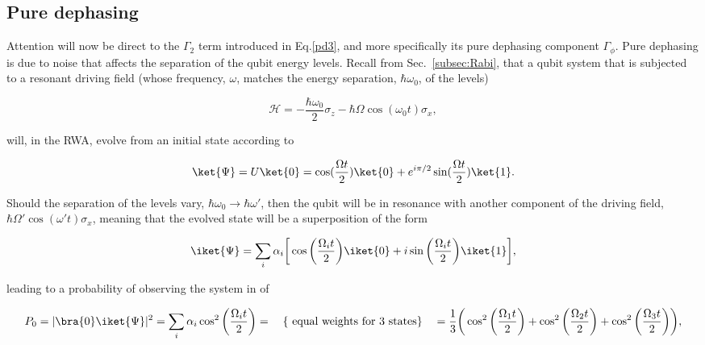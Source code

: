  
 \subsection{Pure dephasing}
  Attention will now be direct to the $ \Gamma_2 $ term introduced in Eq.\eqref{pd3}, and more specifically its pure dephasing component $ \Gamma_\phi $. Pure dephasing is due to noise that affects the separation of the qubit energy levels. Recall from Sec.~\ref{subsec:Rabi}, that a qubit system that is subjected to a resonant driving field (whose frequency, $ \omega $, matches the energy separation, $ \hbar\omega_0 $, of the levels)
  
  \begin{equation}\label{RabiHamiltonian}
  	\mathcal{H} = -\frac{\hbar\omega_0}{2}\sigma_z-\hbar\Omega\cos(\omega_0 t)\sigma_x,
  \end{equation}
  
  \noindent will, in the RWA, evolve from an initial state  according to
  
  \begin{equation}\label{RabuSolution}
  	\ket{\Psi} = U\ket{0} = \cos(\frac{\Omega t}{2})\ket{0}+e^{i\pi/2}\sin(\frac{\Omega t}{2})\ket{1}.
  \end{equation}
  
  \noindent Should the separation of the levels vary, $ \hbar\omega_0 \rightarrow \hbar\omega' $, then the qubit will be in resonance with another component of the driving field, $ \hbar\Omega'\cos(\omega't)\sigma_x $, meaning that the evolved state will be a superposition of the form
  
  \begin{equation}\label{RabuSolutionSuperpos}
  	\iket{\Psi} = \sum_i \alpha_i\bigg[\cos\bigg(\frac{\Omega_i t}{2}\bigg)\iket{0}+i\sin\bigg(\frac{\Omega_i t}{2}\bigg)\iket{1}\bigg],
  \end{equation}
  
  \noindent leading to a probability of observing the system in  of
  
  \begin{equation}\label{RabiProb0}
  	P_0  = |\bra{0}\iket{\Psi}|^2 = \sum_i \alpha_i\cos^2\bigg(\frac{\Omega_it}{2}\bigg)=\quad \left\lbrace \text{ equal weights for 3 states}\right\rbrace \quad= \frac{1}{3}\bigg(\cos^2\bigg(\frac{\Omega_1t}{2}\bigg)+\cos^2\bigg(\frac{\Omega_2t}{2}\bigg)+\cos^2\bigg(\frac{\Omega_3t}{2}\bigg)\bigg),
  \end{equation}
  
